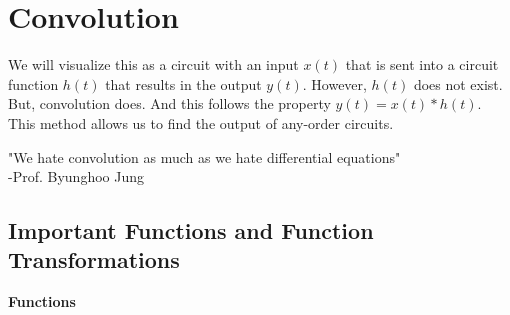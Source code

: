 \documentclass[nobib]{tufte-handout}
\begin{document}
\section{Convolution}
We will visualize this as a circuit with an input $x(t)$ that is sent into a
circuit function $h(t)$ that results in the output $y(t)$. However, $h(t)$ does
not exist. But, convolution does. And this follows the property $y(t) =
    x(t)*h(t)$.\\ This method allows us to find the output of any-order circuits.\\
\begin{center}
    "We hate convolution as much as we hate differential equations" \\-Prof. Byunghoo Jung
\end{center}
\subsection{Important Functions and Function Transformations}
\textbf{Functions}\\
\end{document}
